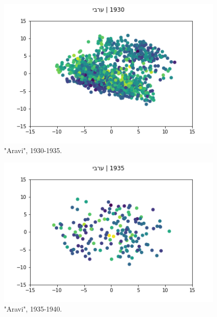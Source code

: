 \documentclass[10pt, a4paper]{article}
\begin{document}
\begin{figure}[!h]
\begin{center}
\includegraphics[scale=0.5]{LREC_PAPER/aravi_cwes/aravi_1930.png}
\caption{"Aravi", 1930-1935.}
\label{Aravi3}
\end{center}
\end{figure}

\begin{figure}[!h]
\begin{center}
\includegraphics[scale=0.5]{LREC_PAPER/aravi_cwes/aravi_1935.png}
\caption{"Aravi", 1935-1940.}
\label{Aravi4}
\end{center}
\end{figure}
\end{document}
